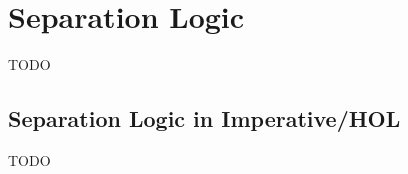 \chapter{Separation Logic}\label{chapter:separation-logic}

TODO

\section{Separation Logic in Imperative/HOL}

TODO
